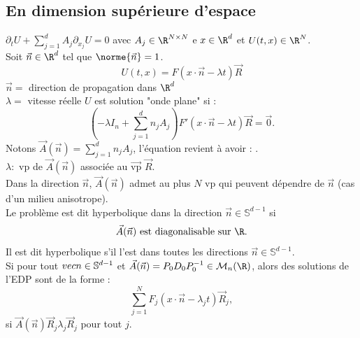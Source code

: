 \documentclass[12pt,a4paper]{article}
\begin{document}
	\subsection{En dimension supérieure d'espace}
	
	$\partial_t U + \displaystyle\sum_{j=1}^d A_j \partial_{x_j} U = 0$ avec $A_j \in \R^{N \times N}$ e $x \in \R^d$ et $U(t,x) \in \R^N$.\\
	Soit $\vec n \in \R^d$ tel que $\norme{\vec n} = 1$.
	\[
	U(t,x) = F(x\cdot \vec n - \lambda t) \vec R
	\]
	$\vec n = $ direction de propagation dans $\R^d$\\
	$\lambda = $ vitesse réelle
	$U$ est solution "onde plane" si  :
	\[
	\left(-\lambda I_n + \displaystyle\sum_{j=1}^d n_j A_j\right)F'(x\cdot \vec n - \lambda t)\vec R = \vec 0.
	\]
	Notons $\vec A(\vec n) = \displaystyle\sum_{j=1}^d n_j A_j$, l'équation revient à avoir : .\\
	$\lambda :$ vp de $\vec A(\vec n)$ associée au $\vec{\mathrm{vp}}$ $\vec R$.\\
	Dans la direction $\vec n$, $\vec A(\vec n)$ admet au plus $N$ vp qui peuvent dépendre de $\vec n$ (cas d'un milieu anisotrope).\\
	Le problème est dit hyperbolique dans la direction $\vec n \in \mathbb{S}^{d-1}$ si
	\[
	\vec A(\vec n) \text{ est diagonalisable sur } \R.
	\]
	Il est dit hyperbolique s'il l'est dans toutes les directions $\vec n \in \mathbb{S}^{d-1}$.\\
	Si pour tout $\\vec n \in \mathbb{S}^{d-1}$ et $\vec A(\vec n) = P_0 D_0P_0^{-1} \in \mathcal M_n(\R)$, alors des solutions de l'EDP sont de la forme :
	\[
	\sum_{j= 1}^N F_j (x\cdot\vec n - \lambda_j t) \vec R_j,
	\]
	si $\vec A(\vec n) \vec R_j \lambda_j \vec R_j$ pour tout $j$.
	
\end{document}
